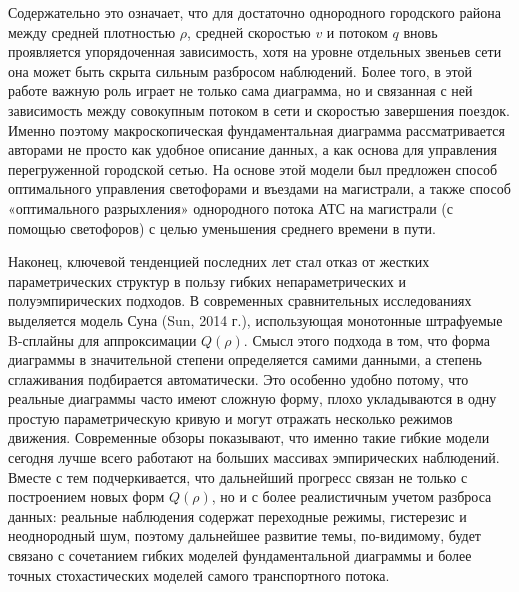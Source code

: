 \documentclass[12pt,a4paper]{article}
\begin{document}
Содержательно это означает, что для достаточно однородного городского района между средней плотностью $\rho$, средней скоростью $v$ и потоком $q$ вновь проявляется упорядоченная зависимость, хотя на уровне отдельных звеньев сети она может быть скрыта сильным разбросом наблюдений. Более того, в этой работе важную роль играет не только сама диаграмма, но и связанная с ней зависимость между совокупным потоком в сети и скоростью завершения поездок. Именно поэтому макроскопическая фундаментальная диаграмма рассматривается авторами не просто как удобное описание данных, а как основа для управления перегруженной городской сетью. На основе этой модели был предложен способ оптимального управления светофорами и въездами на магистрали, а также способ «оптимального разрыхления» однородного потока АТС на магистрали (с помощью светофоров) с целью уменьшения среднего времени в пути.

Наконец, ключевой тенденцией последних лет стал отказ от жестких параметрических структур в пользу гибких непараметрических и полуэмпирических подходов. В современных сравнительных исследованиях выделяется модель Суна (Sun, 2014 г.), использующая монотонные штрафуемые B-сплайны для аппроксимации $Q(\rho)$. Смысл этого подхода в том, что форма диаграммы в значительной степени определяется самими данными, а степень сглаживания подбирается автоматически. Это особенно удобно потому, что реальные диаграммы часто имеют сложную форму, плохо укладываются в одну простую параметрическую кривую и могут отражать несколько режимов движения. Современные обзоры показывают, что именно такие гибкие модели сегодня лучше всего работают на больших массивах эмпирических наблюдений. Вместе с тем подчеркивается, что дальнейший прогресс связан не только с построением новых форм $Q(\rho)$, но и с более реалистичным учетом разброса данных: реальные наблюдения содержат переходные режимы, гистерезис и неоднородный шум, поэтому дальнейшее развитие темы, по-видимому, будет связано с сочетанием гибких моделей фундаментальной диаграммы и более точных стохастических моделей самого транспортного потока.
\end{document}
